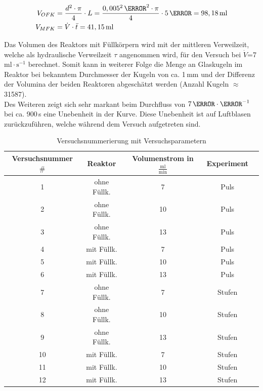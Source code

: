 \documentclass[12pt,liststotoc]{report}
\begin{document}

\begin{align}
    V_{OFK}=&\;\frac{d^2\cdot\pi}{4}\cdot L =          \notag \frac{0,005^2\,\m^2\cdot\pi}{4}\cdot5\,\m = 98,18\,\text{ml} \\ \notag
    V_{MFK}=&\; \dot{V} \cdot \bar{t} = 41,15\,\text{ml} \notag
\end{align}


Das Volumen des Reaktors mit Füllkörpern wird mit der mittleren Verweilzeit, welche als hydraulische Verweilzeit $\tau$ angenommen wird, für den Versuch bei $\dot{V}$=7\,$\text{ml}\cdot\text{s}^{-1}$ berechnet. Somit kann in weiterer Folge die Menge an Glaskugeln im Reaktor bei bekanntem Durchmesser der Kugeln von ca. 1\,mm und der Differenz der Volumina der beiden Reaktoren abgeschätzt werden (Anzahl Kugeln $\approx$ 31587). \\
Des Weiteren zeigt sich sehr markant beim Durchfluss von $7\,\mole\cdot\litre^{-1}$ bei ca. 900\,s eine Unebenheit in der Kurve. Diese Unebenheit ist auf Luftblasen zurückzuführen, welche während dem Versuch aufgetreten sind.

\begin{table}[H]
\centering
\caption{Versuchsnummerierung mit Versuchsparametern}
\begin{tabular}{c|c|c|cc}
\toprule 
Versuchsnummer $\#$ & Reaktor & Volumenstrom in $\frac{\text{ml}}{\text{min}}$ & Experiment \\
\midrule
1 & ohne Füllk.& 7 & Puls \\
2 & ohne Füllk. & 10 & Puls \\
3 & ohne Füllk. & 13 & Puls \\
4 & mit Füllk. & 7 & Puls \\
5 & mit Füllk. & 10 & Puls \\
6 & mit Füllk. & 13 & Puls \\
7 & ohne Füllk. & 7 & Stufen \\
8 & ohne Füllk. & 10 & Stufen \\
9 & ohne Füllk. & 13 & Stufen \\
10 & mit Füllk. & 7 & Stufen\\
11 & mit Füllk. & 10 & Stufen \\
12 & mit Füllk. & 13 & Stufen\\
\bottomrule
\end{tabular}
\label{tab:Versuchsnummerierung}
\end{table}
\noindent
\newpage 
\end{document}
